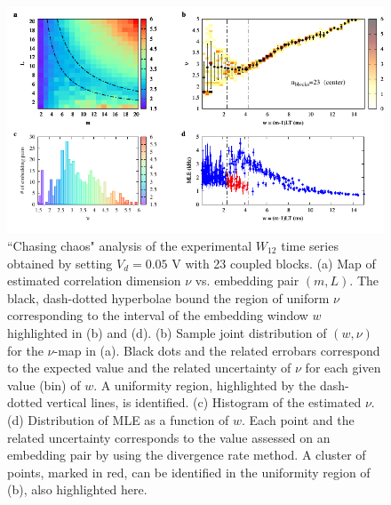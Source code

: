 \begin{figure}[H]
    \centering
    \includegraphics[width=\linewidth]{../blocks/23_blocks/middle/2e5_points/plots/chaos_low.pdf}
    \caption{``Chasing chaos" analysis of the experimental $W_{12}$ time series obtained by setting $V_d=0.05$ V with 23 coupled blocks.
    (a) Map of estimated correlation dimension $\nu$ vs. embedding pair $(m, L)$.
    The black, dash-dotted hyperbolae bound the region of uniform $\nu$ corresponding to the interval of the
    embedding window $w$ highlighted in (b) and (d).
    (b) Sample joint distribution of $(w,\nu)$ for the $\nu$-map in (a).
    Black dots and the related errobars correspond to the expected value and the related uncertainty of $\nu$
    for each given value (bin) of $w$. A uniformity region, highlighted by the dash-dotted vertical lines,
    is identified. (c) Histogram of the estimated $\nu$. (d) Distribution of MLE as a function of $w$. Each point and the related
    uncertainty corresponds to the value assessed on an embedding pair by using the divergence rate method.
    A cluster of points, marked in red, can be identified in the uniformity region of (b), also highlighted here.}
    \label{fig:23 blocks chaos middle}
\end{figure}


